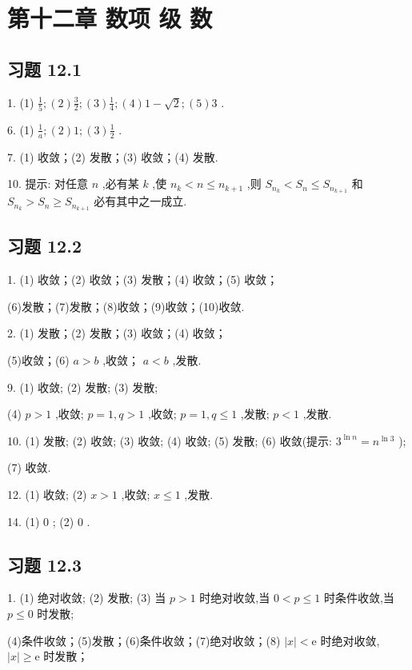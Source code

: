 \section{第十二章 数项 级 数}

\subsection{习题 12.1}

1. (1) \(\frac{1}{5};\left( 2\right) \frac{3}{2};\left( 3\right) \frac{1}{4};\left( 4\right) 1 - \sqrt{2};\left( 5\right) 3\) .

6. (1) \(\frac{1}{a};\left( 2\right) 1;\left( 3\right) \frac{1}{2}\) .

7. (1) 收敛；(2) 发散；(3) 收敛；(4) 发散.

10. 提示: 对任意 \(n\) ,必有某 \(k\) ,使 \({n}_{k} < n \leq  {n}_{k + 1}\) ,则 \({S}_{{n}_{k}} < {S}_{n} \leq  {S}_{{n}_{k + 1}}\) 和 \({S}_{{n}_{k}} > {S}_{n} \geq  {S}_{{n}_{k + 1}}\) 必有其中之一成立.

\subsection{习题 12.2}

1. (1) 收敛；(2) 收敛；(3) 发散；(4) 收敛；(5) 收敛；

(6)发散；(7)发散；(8)收敛；(9)收敛；(10)收敛.

2. (1) 发散；(2) 发散；(3) 收敛；(4) 收敛；

(5)收敛；(6) \(a > b\) ,收敛； \(a < b\) ,发散.

9. (1) 收敛; (2) 发散; (3) 发散;

(4) \(p > 1\) ,收敛; \(p = 1,q > 1\) ,收敛; \(p = 1,q \leq  1\) ,发散; \(p < 1\) ,发散.

10. (1) 发散; (2) 收敛; (3) 收敛; (4) 收敛; (5) 发散; (6) 收敛(提示: \({3}^{\ln n} = {n}^{\ln 3}\) );

(7) 收敛.

12. (1) 收敛; (2) \(x > 1\) ,收敛; \(x \leq  1\) ,发散.

14. (1) 0 ; (2) 0 .

\subsection{习题 12.3}

1. (1) 绝对收敛; (2) 发散; (3) 当 \(p > 1\) 时绝对收敛,当 \(0 < p \leq  1\) 时条件收敛,当 \(p \leq  0\) 时发散;

(4)条件收敛；(5)发散；(6)条件收敛；(7)绝对收敛；(8) \(\left| x\right|  < \mathrm{e}\) 时绝对收敛, \(\left| x\right|  \geq  \mathrm{e}\) 时发散；

